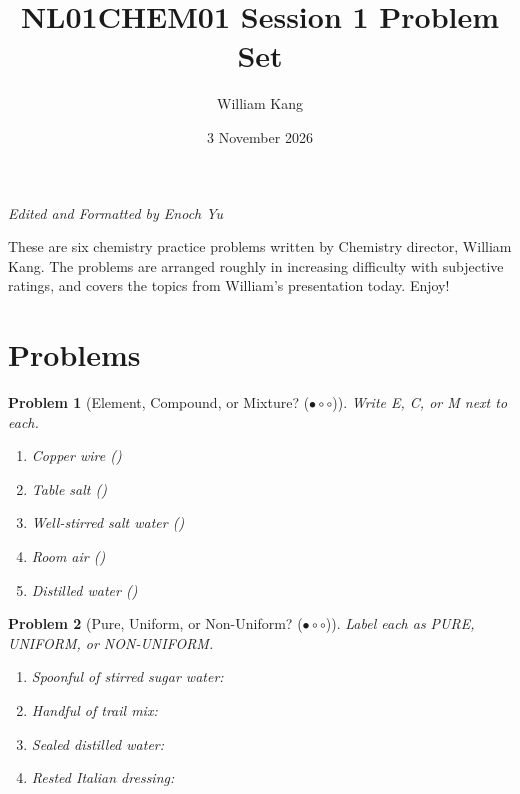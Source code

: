 \documentclass[a4paper,11pt]{article}
\title{\textbf{NL01CHEM01 Session 1 Problem Set}}
\date{3 November 2026}
\author{William Kang}
\newcommand{\easy}{(\ensuremath{\bullet \circ \circ})}
\theoremstyle{listprobstyle}
\newtheorem{problem}{Problem}
\begin{document}
\maketitle
\begin{center}
    \small\textit{Edited and Formatted by Enoch Yu}
\end{center}

\vspace{\baselineskip}
\begin{center}
\begin{minipage}{0.7\textwidth}
These are six chemistry practice problems written by Chemistry
director, William Kang. The problems are arranged roughly in
increasing difficulty with subjective ratings, and covers the topics
from William's presentation today. Enjoy!
\end{minipage}
\end{center}
\vspace{\baselineskip}

\section{Problems}
\begin{problem}[Element, Compound, or Mixture? \easy]
Write E, C, or M next to each.
\vspace{-0.6\baselineskip}
\begin{enumerate}[label=\alph*),itemsep=0pt,parsep=0pt,topsep=0pt]
\item Copper wire (\phantom{X})
\item Table salt (\phantom{X})
\item Well-stirred salt water (\phantom{X})
\item Room air (\phantom{X})
\item Distilled water (\phantom{X})
\end{enumerate}
\end{problem}

\begin{problem}[Pure, Uniform, or Non-Uniform? \easy]
Label each as PURE, UNIFORM, or NON-UNIFORM.
\vspace{-0.6\baselineskip}
\begin{enumerate}[label=\alph*),itemsep=0pt,parsep=0pt,topsep=0pt]
\item Spoonful of stirred sugar water:
    \underline{\phantom{XXXXXXXXXXXX}}
\item Handful of trail mix: \underline{\phantom{XXXXXXXXXXXX}}
\item Sealed distilled water: \underline{\phantom{XXXXXXXXXXXX}}
\item Rested Italian dressing: \underline{\phantom{XXXXXXXXXXXX}}
\end{enumerate}
\end{problem}
\end{document}

